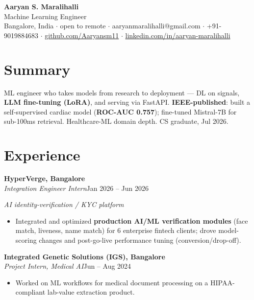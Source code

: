 \documentclass[10pt,a4paper]{article}
\begin{document}
\vspace*{-1cm}
\begin{center}
{\LARGE\bfseries Aaryan S. Maralihalli}\\[0.5em]
{\large Machine Learning Engineer}\\[0.3em]
Bangalore, India $\cdot$ open to remote $\cdot$ aaryanmaralihalli@gmail.com $\cdot$ +91-9019884683 $\cdot$ \href{https://github.com/Aaryansm11}{github.com/Aaryansm11} $\cdot$ \href{https://linkedin.com/in/aaryan-maralihalli}{linkedin.com/in/aaryan-maralihalli}
\end{center}\vspace{0.4ex}
\section*{Summary}
ML engineer who takes models from research to deployment --- DL on signals, \textbf{LLM fine-tuning (LoRA)}, and serving via FastAPI. \textbf{IEEE-published}: built a self-supervised cardiac model (\textbf{ROC-AUC 0.757}); fine-tuned Mistral-7B for sub-100ms retrieval. Healthcare-ML domain depth. CS graduate, Jul 2026.\par\vspace{2pt}
\section*{Experience}
\vspace{1pt}\textbf{HyperVerge, Bangalore}\\
\textit{Integration Engineer Intern}\hfill Jan 2026 -- Jun 2026\par\vspace{1pt}
{\small\itshape AI identity-verification / KYC platform}\par\vspace{1pt}
\begin{itemize}
\item Integrated and optimized \textbf{production AI/ML verification modules} (face match, liveness, name match) for 6 enterprise fintech clients; drove model-scoring changes and post-go-live performance tuning (conversion/drop-off).
\end{itemize}
\vspace{1pt}\textbf{Integrated Genetic Solutions (IGS), Bangalore}\\
\textit{Project Intern, Medical AI}\hfill Jun -- Aug 2024\par\vspace{1pt}
\begin{itemize}
\item Worked on ML workflows for medical document processing on a HIPAA-compliant lab-value extraction product.
\end{itemize}
\end{document}
